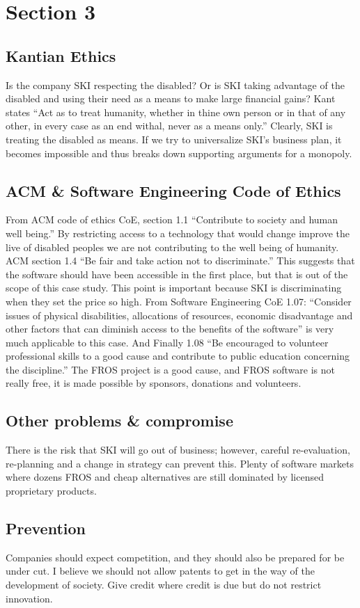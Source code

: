 \section{Section 3}
\subsection{Kantian Ethics}
Is the company SKI respecting the disabled? Or is SKI taking advantage of the disabled and using their need as a means to make large financial gains? Kant states “Act as to treat humanity, whether in thine own person or in that of any other, in every case as an end withal, never as a means only.” Clearly, SKI is treating the disabled as means. If we try to universalize SKI’s business plan, it becomes impossible and thus breaks down supporting arguments for a monopoly.
\subsection{ACM \& Software Engineering Code of Ethics}
From ACM code of ethics CoE, section 1.1 ``Contribute to society and human well being.'' By restricting access to a technology that would change improve the live of disabled peoples we are not contributing to the well being of humanity. ACM section 1.4 ``Be fair and take action not to discriminate.'' This suggests that the software should have been accessible in the first place, but that is out of the scope of this case study. This point is important because SKI is discriminating when they set the price so high. From Software Engineering CoE 1.07: ``Consider issues of physical disabilities, allocations of resources, economic disadvantage and other factors that can diminish access to the benefits of the software'' is very much applicable to this case. And Finally 1.08 ``Be encouraged to volunteer professional skills to a good cause and contribute to public education concerning the discipline.'' The FROS project is a good cause, and FROS software is not really free, it is made possible by sponsors, donations and volunteers.
\subsection{Other problems \& compromise}
There is the risk that SKI will go out of business; however, careful re-evaluation, re-planning and a change in strategy can prevent this. Plenty of software markets where dozens FROS and cheap alternatives are still dominated by licensed proprietary products. 
\subsection{Prevention}
Companies should expect competition, and they should also be prepared for be under cut. I believe we should not allow patents to get in the way of the development of society. Give credit where credit is due but do not restrict innovation. 